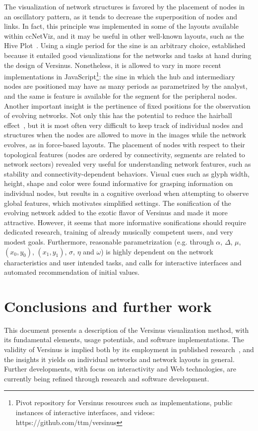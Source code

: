 \documentclass[runningheads]{llncs}
\begin{document}
The visualization of network structures is favored by the placement of nodes in an oscillatory pattern, as it tends to decrease the superposition of nodes and links. In fact, this principle was implemented in some of the layouts available within ccNetViz, and it may be useful in other well-known layouts, such as the Hive Plot~\cite{hive}.
Using a single period for the sine is an arbitrary choice, established because it entailed good visualizations for the networks and tasks at hand during the design of Versinus. Nonetheless, it is allowed to vary in more recent implementations in JavaScript\footnote{Pivot repository for Versinus resources such as implementations, public instances of interactive interfaces, and videos: https://github.com/ttm/versinus}: the sine in which the hub and intermediary nodes are positioned may have as many periods as parametrized by the analyst, and the same is feature is available for the segment for the peripheral nodes.
Another important insight is the pertinence of fixed positions for the observation of evolving networks.
Not only this has the potential to reduce the hairball effect~\cite{hairball},
but it is most often very difficult to keep track of individual nodes and structures when the nodes are allowed to move in the images while the network evolves, as in force-based layouts.
The placement of nodes with respect to their topological features (nodes are ordered by connectivity,
segments are related to network sectors) revealed very useful for understanding network features,
such as stability and connectivity-dependent behaviors.
Visual cues such as glyph width, height, shape and color were found informative for grasping information on individual nodes,
but results in a cognitive overload when attempting to observe global features,
which motivates simplified settings.
The sonification of the evolving network added to the exotic flavor of Versinus and made it more attractive.
However, it seems that more informative sonifications should require dedicated research,
training of already musically competent users, and very modest goals. 
Furthermore, reasonable parametrization (e.g. through $\alpha$, $\Delta$, $\mu$, $(x_0, y_0)$, $(x_1, y_1)$, $\sigma$, $\eta$ and $\omega$) is highly dependent on the network characteristics and user intended tasks, and calls for interactive interfaces and automated recommendation of initial values.

\section{Conclusions and further work}\label{sec:con}
This document presents a description of the Versinus visualization method, with its fundamental elements, usage potentials, and software implementations.
The validity of Versinus is implied both by its employment in published research~\cite{stab,thesis}, and the insights it yields on individual networks and network
layouts in general.
Further developments,
with focus on interactivity and Web technologies,
are currently being refined
through research and software development.
\end{document}
